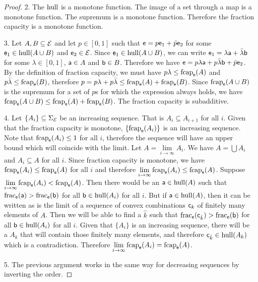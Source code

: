 \begin{mathSection}
\begin{proof}
		2. The $\hull$ is a monotone function. The image of a set through a map is a monotone function. The supremum is a monotone function. Therefore the fraction capacity is a monotone function.
		
		3. Let $A, B \subseteq \Ens$ and let $p \in [0,1]$ such that $\ens = p \ens_1 + \bar{p} \ens_2$ for some $\ens_1 \in \hull(A \cup B)$ and $\ens_2 \in \Ens$. Since $\ens_1 \in \hull(A \cup B)$, we can write $\ens_1 = \lambda \ens[a] + \bar{\lambda} \ens[b]$ for some $\lambda \in [0,1]$, $\ens[a] \in A$ and $\ens[b] \in B$. Therefore we have $\ens = p \lambda \ens[a] + p \bar{\lambda} \ens[b] + \bar{p} \ens_2$. By the definition of fraction capacity, we must have $p\lambda \leq \fcap_{\ens}(A)$ and $p\bar{\lambda} \leq \fcap_{\ens}(B)$, therefore $p = p\lambda + p\bar{\lambda} \leq \fcap_{\ens}(A) + \fcap_{\ens}(B)$. 	Since $\fcap_{\ens}(A \cup B)$ is the supremum for a set of $p$s for which the expression always holds, we have $\fcap_{\ens}(A \cup B) \leq \fcap_{\ens}(A) + \fcap_{\ens}(B)$. The fraction capacity is subadditive.
		
		4. Let $\{A_i\} \subseteq \Sigma_{\Ens}$ be an increasing sequence. That is $A_i \subseteq A_{i+1}$ for all $i$. Given that the fraction capacity is monotone, $\{\fcap_{\ens}(A_i)\}$ is an increasing sequence. Note that $\fcap_{\ens}(A_i) \leq 1$ for all $i$, therefore the sequence will have an upper bound which will coincide with the limit. Let $A = \lim\limits_{i \to \infty} A_i$. We have $A = \bigcup A_i$ and $A_i \subseteq A$ for all $i$. Since fraction capacity is monotone, we have $\fcap_{\ens}(A_i) \leq \fcap_{\ens}(A)$ for all $i$ and therefore $\lim\limits_{i \to \infty} \fcap_{\ens}(A_i) \leq \fcap_{\ens}(A)$. Suppose $\lim\limits_{i \to \infty} \fcap_{\ens}(A_i) < \fcap_{\ens}(A)$. Then there would be an $\ens[a] \in \hull(A)$ such that $\size_{\ens}(\ens[a]) > \size_{\ens}(\ens[b])$ for all $\ens[b] \in \hull(A_i)$ for all $i$. But if $\ens[a] \in \hull(A)$, then it can be written as is the limit of a sequence of convex combinations $\ens[c]_k$ of finitely many elements of $A$. Then we will be able to find a $\hat{k}$ such that $\size_{\ens}(\ens[c]_{\hat{k}}) > \size_{\ens}(\ens[b])$ for all $\ens[b] \in \hull(A_i)$ for all $i$. Given that $\{A_i\}$ is an increasing sequence, there will be a $A_k$ that will contain those finitely many elements, and therefore $\ens[c]_{\hat{k}} \in \hull(A_k)$ which is a contradiction. Therefore $\lim\limits_{i \to \infty} \fcap_{\ens}(A_i) = \fcap_{\ens}(A)$.
		
		5. The previous argument works in the same way for decreasing sequences by inverting the order.
	\end{proof}
\end{mathSection}


